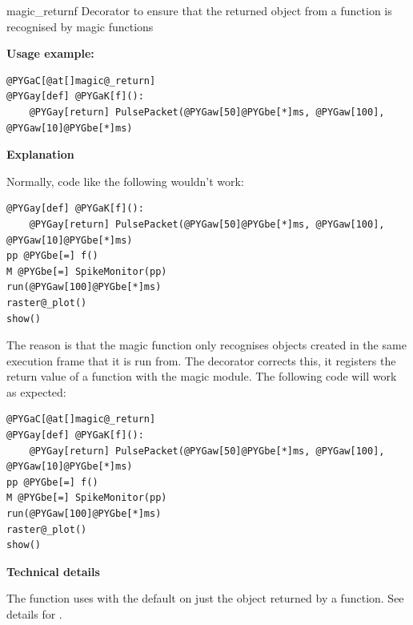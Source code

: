 \documentclass[letterpaper,10pt,english]{manual}
\begin{document}
\hypertarget{brian.magic_return}{}\begin{funcdesc}{magic\_return}{f}
Decorator to ensure that the returned object from a function is recognised by magic functions

\textbf{Usage example:}

\begin{Verbatim}[commandchars=@\[\]]
@PYGaC[@at[]magic@_return]
@PYGay[def] @PYGaK[f]():
    @PYGay[return] PulsePacket(@PYGaw[50]@PYGbe[*]ms, @PYGaw[100], @PYGaw[10]@PYGbe[*]ms)
\end{Verbatim}

\textbf{Explanation}

Normally, code like the following wouldn't work:

\begin{Verbatim}[commandchars=@\[\]]
@PYGay[def] @PYGaK[f]():
    @PYGay[return] PulsePacket(@PYGaw[50]@PYGbe[*]ms, @PYGaw[100], @PYGaw[10]@PYGbe[*]ms)
pp @PYGbe[=] f()
M @PYGbe[=] SpikeMonitor(pp)
run(@PYGaw[100]@PYGbe[*]ms)
raster@_plot()
show()
\end{Verbatim}

The reason is that the magic function \hyperlink{brian.run}{} only recognises objects created
in the same execution frame that it is run from. The \hyperlink{brian.magic_return}{} decorator
corrects this, it registers the return value of a function with the magic
module. The following code will work as expected:

\begin{Verbatim}[commandchars=@\[\]]
@PYGaC[@at[]magic@_return]
@PYGay[def] @PYGaK[f]():
    @PYGay[return] PulsePacket(@PYGaw[50]@PYGbe[*]ms, @PYGaw[100], @PYGaw[10]@PYGbe[*]ms)
pp @PYGbe[=] f()
M @PYGbe[=] SpikeMonitor(pp)
run(@PYGaw[100]@PYGbe[*]ms)
raster@_plot()
show()
\end{Verbatim}

\textbf{Technical details}

The \hyperlink{brian.magic_return}{} function uses \hyperlink{brian.magic_register}{} with the default 
on just the object returned by a function. See details for \hyperlink{brian.magic_register}{}.
\end{funcdesc}
\end{document}
